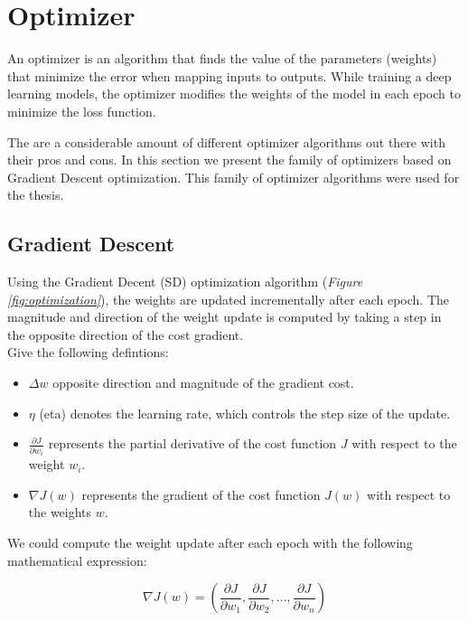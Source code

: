 \section{Optimizer}

An optimizer is an algorithm that finds the value of the parameters (weights)
that minimize the error when mapping inputs to outputs. While training a deep
learning models, the optimizer modifies the weights of the model in each epoch
to minimize the loss function. \newline

The are a considerable amount of different optimizer algorithms out there with
their pros and cons. In this section we present the family of optimizers based
on Gradient Descent optimization. This family of optimizer algorithms were used
for the thesis. \newline

\subsection{Gradient Descent}

Using the Gradient Decent (SD) optimization algorithm (\textit{Figure
\ref{fig:optimization}}), the weights are updated incrementally after each
epoch. The magnitude and direction of the weight update is computed by taking a
step in the opposite direction of the cost gradient. \\

Give the following defintions:

\begin{itemize}
  \item \(\Delta w\) opposite direction and magnitude of the gradient cost.
  \item \(\eta\) (eta) denotes the learning rate, which controls the step size of the update.
  \item  \(\frac{\partial J}{\partial w_i}\) represents the partial derivative of the cost function \(J\) with respect to the weight \(w_i\).
  \item \(\nabla J(w)\) represents the gradient of the cost function \(J(w)\) with respect to the weights \(w\).
\end{itemize}

We could compute the weight update after each epoch with the following
mathematical expression:

\[\nabla J(w) = (\frac{\partial J}{\partial w_1}, \frac{\partial J}{\partial w_2}, \ldots, \frac{\partial J}{\partial w_n})\]


